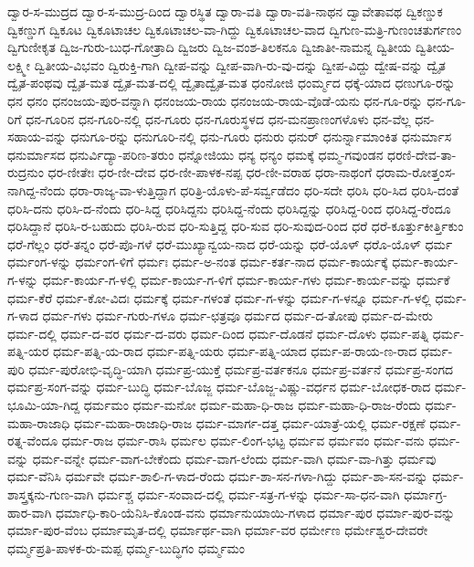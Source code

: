 ದ್ವಾರ-ಸ-ಮುದ್ರದ
ದ್ವಾರ-ಸ-ಮುದ್ರ-ದಿಂದ
ದ್ವಾರಸ್ಥಿತ
ದ್ವಾರಾ-ವತಿ
ದ್ವಾರಾ-ವತಿ-ನಾಥನ
ದ್ವಾವೇತಾವಥ
ದ್ವಿಕಣ್ಡುಕ
ದ್ವಿಕಣ್ಡುಗ
ದ್ವಿಕೂಟ
ದ್ವಿಕೂಟಾಚಲ
ದ್ವಿಕೂಟಾಚಲ-ವಾ-ಗಿದ್ದು
ದ್ವಿಕೂಟಾಚಲ-ವಾದ
ದ್ವಿಗುಣ-ಮತ್ರಿ-ಗುಣಂಚತುರ್ಗಣಂ
ದ್ವಿಗುಣೀಕೃತ
ದ್ವಿಜ-ಗುರು-ಬುಧ-ಗೋತ್ರಾದಿ
ದ್ವಿಜರು
ದ್ವಿಜ-ವಂಶ-ತಿಲಕನೂ
ದ್ವಿಜಾತೀ-ನಾಮನ್ನ
ದ್ವಿತೀಯ
ದ್ವಿತೀಯ-ಲಕ್ಷ್ಮೀ
ದ್ವಿತೀಯ-ವಿಭವಂ
ದ್ವಿರುಕ್ತಿ-ಗಾಗಿ
ದ್ವೀಪ-ವನ್ನು
ದ್ವೀಪ-ವಾಗಿ-ರು-ವು-ದನ್ನು
ದ್ವೀಪ-ವಿದ್ದು
ದ್ವೇಷ-ವನ್ನು
ದ್ವೈತ
ದ್ವೈತ-ಪಂಥವು
ದ್ವೈತ-ಮತ
ದ್ವೈತ-ಮತ-ದಲ್ಲಿ
ದ್ವೈತಾದ್ವೈತ-ಮತ
ಧಂನೋಜಿ
ಧಂರ್ಮ್ಮದ
ಧಕ್ಕೆ-ಯಾದ
ಧಣುಗೂ-ರನ್ನು
ಧನ
ಧನಂ
ಧನಂಜಯ-ಪುರ-ವನ್ನಾಗಿ
ಧನಂಜಯ-ರಾಯ
ಧನಂಜಯ-ರಾಯ-ವೊಡೆ-ಯನು
ಧನ-ಗೂ-ರನ್ನು
ಧನ-ಗೂ-ರಿಗೆ
ಧನ-ಗೂರಿನ
ಧನ-ಗೂರಿ-ನಲ್ಲಿ
ಧನ-ಗೂರು
ಧನ-ಗೂರುಸ್ಥಳದ
ಧನ-ಮನಪ್ರಾಣಂಗಳೊಳು
ಧನ-ವೆಲ್ಲ
ಧನ-ಸಹಾಯ-ವನ್ನು
ಧನುಗೂ-ರನ್ನು
ಧನುಗೂರಿ-ನಲ್ಲಿ
ಧನು-ಗೂರು
ಧನುರು
ಧನುರ್
ಧನುರ್ನ್ನಾಮಾಂಕಿತ
ಧನುರ್ಮಾಸ
ಧನುರ್ಮಾಸದ
ಧನುರ್ವಿದ್ಯಾ-ಪರಿಣ-ತರುಂ
ಧನ್ನೋಜಿಯು
ಧನ್ಯ
ಧನ್ಯಂ
ಧಮಕ್ಕೆ
ಧಮ್ಮ-ಗವುಂಡನ
ಧರಣಿ-ದೇವ-ತಾ-ರುದ್ರನುಂ
ಧರ-ಣೀತೇಃ
ಧರ-ಣೀ-ದೇವ
ಧರ-ಣೀ-ಪಾಳಕ-ನಪ್ಪ
ಧರ-ಣೀ-ವರಾಹ
ಧರಾ-ನಾಥಂಗೆ
ಧರಾಮ-ರೋತ್ತಂಸ-ನಾಗಿದ್ದ-ನೆಂದು
ಧರಾ-ರಾಜ್ಯ-ವಾ-ಳುತ್ತಿದ್ದಾಗ
ಧರಿತ್ರಿ-ಯೊಳು-ಪೆ-ಸರ್ವ್ವಡೆದಂ
ಧರಿ-ಸದೇ
ಧರಿಸಿ
ಧರಿ-ಸಿದ
ಧರಿಸಿ-ದಂತೆ
ಧರಿಸಿ-ದನು
ಧರಿಸಿ-ದ-ನೆಂದು
ಧರಿ-ಸಿದ್ದ
ಧರಿಸಿದ್ದನು
ಧರಿಸಿದ್ದ-ನೆಂದು
ಧರಿಸಿದ್ದನ್ನು
ಧರಿಸಿದ್ದ-ರಿಂದ
ಧರಿಸಿದ್ದ-ರೆಂದೂ
ಧರಿಸಿದ್ದಾನೆ
ಧರಿಸಿ-ರ-ಬಹುದು
ಧರಿಸಿ-ರುವ
ಧರಿ-ಸುತ್ತಿದ್ದ
ಧರಿ-ಸುವ
ಧರಿ-ಸುವುದ-ರಿಂದ
ಧರೆ
ಧರೆ-ಕೂರ್ತ್ತುಕೀರ್ತ್ತಿಕುಂ
ಧರೆ-ಗೆಲ್ಲಂ
ಧರೆ-ತನ್ನಂ
ಧರೆ-ಪೊ-ಗಳೆ
ಧರೆ-ಮುಖ್ಯಾನ್ವಯ-ನಾದ
ಧರೆ-ಯನ್ನು
ಧರೆ-ಯೊಳ್
ಧರೊ-ಯೊಳ್
ಧರ್ಮ
ಧರ್ಮಂಗ-ಳನ್ನು
ಧರ್ಮಂಗ-ಳಿಗೆ
ಧರ್ಮಃ
ಧರ್ಮ-ಅ-ನಂತ
ಧರ್ಮ-ಕರ್ತ-ನಾದ
ಧರ್ಮ-ಕಾರ್ಯಕ್ಕೆ
ಧರ್ಮ-ಕಾರ್ಯ-ಗ-ಳನ್ನು
ಧರ್ಮ-ಕಾರ್ಯ-ಗ-ಳಲ್ಲಿ
ಧರ್ಮ-ಕಾರ್ಯ-ಗ-ಳಿಗೆ
ಧರ್ಮ-ಕಾರ್ಯ-ಗಳು
ಧರ್ಮ-ಕಾರ್ಯ-ವನ್ನು
ಧರ್ಮಕೆ
ಧರ್ಮ-ಕೆರೆ
ಧರ್ಮ-ಕೋ-ವಿದಃ
ಧರ್ಮಕ್ಕೆ
ಧರ್ಮ-ಗಳಂತೆ
ಧರ್ಮ-ಗ-ಳನ್ನು
ಧರ್ಮ-ಗ-ಳನ್ನೂ
ಧರ್ಮ-ಗ-ಳಲ್ಲಿ
ಧರ್ಮ-ಗ-ಳಾದ
ಧರ್ಮ-ಗಳು
ಧರ್ಮ-ಗುರು-ಗಳೂ
ಧರ್ಮ-ಛತ್ರವೂ
ಧರ್ಮದ
ಧರ್ಮ-ದ-ತೋಪು
ಧರ್ಮ-ದ-ಮೇರು
ಧರ್ಮ-ದಲ್ಲಿ
ಧರ್ಮ-ದ-ವರ
ಧರ್ಮ-ದ-ವರು
ಧರ್ಮ-ದಿಂದ
ಧರ್ಮ-ದೊಡನೆ
ಧರ್ಮ-ದೊಳು
ಧರ್ಮ-ಪತ್ನಿ
ಧರ್ಮ-ಪತ್ನಿ-ಯರ
ಧರ್ಮ-ಪತ್ನಿ-ಯ-ರಾದ
ಧರ್ಮ-ಪತ್ನಿ-ಯರು
ಧರ್ಮ-ಪತ್ನಿ-ಯಾದ
ಧರ್ಮ-ಪ-ರಾಯ-ಣ-ರಾದ
ಧರ್ಮ-ಪುರಿ
ಧರ್ಮ-ಪುರೋಭಿ-ವೃದ್ಧಿ-ಯಾಗಿ
ಧರ್ಮಪ್ರ-ಯುಕ್ತೆ
ಧರ್ಮಪ್ರ-ವರ್ತಕನೂ
ಧರ್ಮಪ್ರ-ವರ್ತನೆ
ಧರ್ಮಪ್ರ-ಸಂಗದ
ಧರ್ಮಪ್ರ-ಸಂಗ-ವನ್ನು
ಧರ್ಮ-ಬುದ್ಧಿ
ಧರ್ಮ-ಬೊಜ್ಜ
ಧರ್ಮ-ಬೊಜ್ಜ-ವಿಷ್ಣು-ವರ್ಧನ
ಧರ್ಮ-ಬೋಧಕ-ರಾದ
ಧರ್ಮ-ಭೂಮಿ-ಯಾ-ಗಿದ್ದ
ಧರ್ಮಮಂ
ಧರ್ಮ-ಮನೋ
ಧರ್ಮ-ಮಹಾ-ಧಿ-ರಾಜ
ಧರ್ಮ-ಮಹಾ-ಧಿ-ರಾಜ-ರೆಂದು
ಧರ್ಮ-ಮಹಾ-ರಾಜಾಧಿ
ಧರ್ಮ-ಮಹಾ-ರಾಜಾಧಿ-ರಾಜ
ಧರ್ಮ-ಮಾರ್ಗ-ದತ್ತ
ಧರ್ಮ-ಯಾತ್ರೆ-ಯಲ್ಲಿ
ಧರ್ಮ-ರಕ್ಷಣೆ
ಧರ್ಮ-ರತ್ನ-ವೆಂದೂ
ಧರ್ಮ-ರಾಜ
ಧರ್ಮ-ರಾಸಿ
ಧರ್ಮಲ
ಧರ್ಮ-ಲಿಂಗ-ಭಟ್ಟ
ಧರ್ಮವ
ಧರ್ಮವಂ
ಧರ್ಮ-ವನು
ಧರ್ಮ-ವನ್ನು
ಧರ್ಮ-ವನ್ನೇ
ಧರ್ಮ-ವಾಗ-ಬೇಕೆಂದು
ಧರ್ಮ-ವಾಗ-ಲೆಂದು
ಧರ್ಮ-ವಾಗಿ
ಧರ್ಮ-ವಾ-ಗಿತ್ತು
ಧರ್ಮವು
ಧರ್ಮ-ವೆನಿಸಿ
ಧರ್ಮವೇ
ಧರ್ಮ-ಶಾಲಿ-ಗ-ಳಾದ-ರೆಂದು
ಧರ್ಮ-ಶಾ-ಸನ-ಗಳಾ-ಗಿದ್ದು
ಧರ್ಮ-ಶಾ-ಸನ-ವನ್ನು
ಧರ್ಮ-ಶಾಸ್ತ್ರಕ್ಕನು-ಗುಣ-ವಾಗಿ
ಧರ್ಮಶ್ಚ
ಧರ್ಮ-ಸಂವಾದ-ದಲ್ಲಿ
ಧರ್ಮ-ಸತ್ರ-ಗ-ಳನ್ನು
ಧರ್ಮ-ಸಾ-ಧನ-ವಾಗಿ
ಧರ್ಮಾಗ್ರ-ಹಾರ-ವಾಗಿ
ಧರ್ಮಾಧಿ-ಕಾರಿ-ಯೆನಿಸಿ-ಕೊಂಡ-ವನು
ಧರ್ಮಾನುಯಾಯಿ-ಗಳಾದ
ಧರ್ಮಾ-ಪುರ
ಧರ್ಮಾ-ಪುರ-ವನ್ನು
ಧರ್ಮಾ-ಪುರ-ವೆಂಬ
ಧರ್ಮಾಮೃತ-ದಲ್ಲಿ
ಧರ್ಮಾರ್ಥ-ವಾಗಿ
ಧರ್ಮಾ-ವರ
ಧರ್ಮೇಣ
ಧರ್ಮೇಶ್ವರ-ದೇವರೇ
ಧರ್ಮ್ಮಪ್ರತಿ-ಪಾಳಕ-ರು-ಮಪ್ಪ
ಧರ್ಮ್ಮ-ಬುದ್ಧಿಗಂ
ಧರ್ಮ್ಮಮಂ
